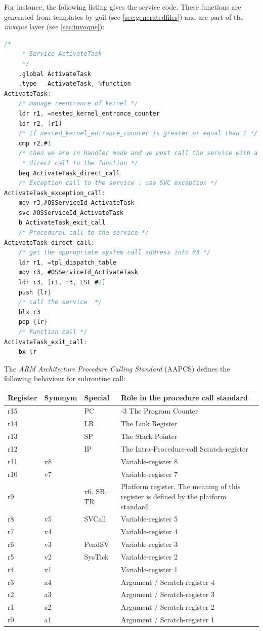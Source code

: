 For instance, the following listing gives the  service code. These functions are generated from templates by goil (see \ref{sec:generatedfiles}) and are part of the {\em invoque} layer (see \ref{sec:invoque}):

\begin{lstlisting}[language=C]
	/* 
	 * Service ActivateTask
	 */
	.global ActivateTask
	.type   ActivateTask, %function
ActivateTask:
	/* manage reentrance of kernel */
	ldr r1, =nested_kernel_entrance_counter
	ldr r2, [r1]
	/* If nested_kernel_entrance_counter is greater or equal than 1 */
	cmp r2,#1
	/* then we are in Handler mode and we must call the service with a 
	 * direct call to the function */
	beq ActivateTask_direct_call
	/* Exception call to the service : use SVC exception */
ActivateTask_exception_call:
	mov r3,#OSServiceId_ActivateTask
	svc #OSServiceId_ActivateTask
	b ActivateTask_exit_call
	/* Procedural call to the service */
ActivateTask_direct_call:
	/* get the appropriate system call address into R3 */
	ldr r1, =tpl_dispatch_table
	mov r3, #OSServiceId_ActivateTask
	ldr r3, [r1, r3, LSL #2]
	push {lr}
	/* call the service  */
	blx r3
	pop {lr}
	/* Function call */
ActivateTask_exit_call:
	bx lr
\end{lstlisting}

The \textit{ARM Architecture Procedure Calling Standard} (AAPCS) defines the following behaviour for subroutine call:
\begin{longtable}[c]{l l l p{5cm}}
\toprule
{\bf Register} & {\bf Synonym} & {\bf Special} & {\bf Role in the procedure call standard} \\
\midrule
r15 & & PC & -3 The Program Counter \\
\hline
r14 & & LR & The Link Register \\
\hline
r13 & & SP & The Stack Pointer \\
\hline
r12 & & IP & The Intra-Procedure-call Scratch-register \\
\hline
r11 & v8 & & Variable-register 8 \\
\hline
r10 & v7 & & Variable-register 7 \\
\hline
r9 & & v6, SB, TR & Platform register. The meaning of this register is defined by the platform standard. \\
\hline
r8 & v5 & SVCall & Variable-register 5 \\
\hline
r7 & v4 & & Variable-register 4 \\
\hline
r6 & v3 & PendSV & Variable-register 3 \\
\hline
r5 & v2 & SysTick & Variable-register 2 \\
\hline
r4 & v1 & & Variable-register 1 \\
\hline
r3 & a4 & & Argument / Scratch-register 4 \\
\hline
r2 & a3 & & Argument / Scratch-register 3 \\
\hline
r1 & a2 & & Argument / Scratch-register 2 \\
\hline
r0 & a1 & & Argument / Scratch-register 1 \\
\bottomrule
\end{longtable}

